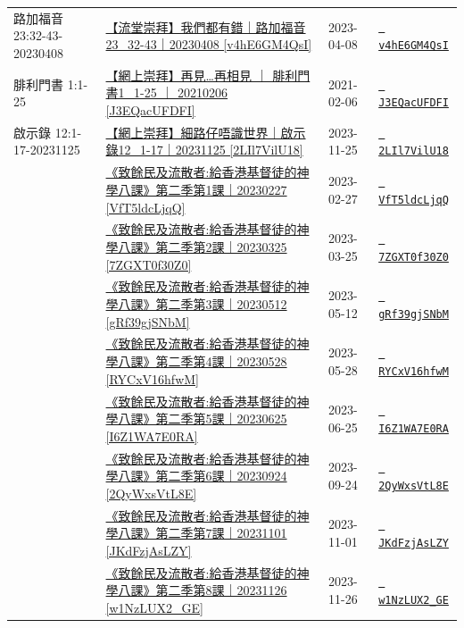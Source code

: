\documentclass{book}
\begin{document}
{\begin{xltabular}{\textwidth}{|p{0.15\textwidth} p{0.6\textwidth}|p{0.07\textwidth} p{0.1\textwidth}|}
路加福音 23:32-43-20230408 & \hyperref[sec:v4hE6GM4QsI]{【流堂崇拜】我們都有錯｜路加福音23\_32-43｜20230408 [v4hE6GM4QsI]} & 2023-04-08 & \href{https://youtube.com/watch?v=v4hE6GM4QsI}{\texttt{ v4hE6GM4QsI}} \\
腓利門書 1:1-25 & \hyperref[sec:J3EQacUFDFI]{【網上崇拜】再見…再相見 ｜ 腓利門書1\_1-25 ｜ 20210206 [J3EQacUFDFI]} & 2021-02-06 & \href{https://youtube.com/watch?v=J3EQacUFDFI}{\texttt{ J3EQacUFDFI}} \\
啟示錄 12:1-17-20231125 & \hyperref[sec:2LIl7VilU18]{【網上崇拜】細路仔唔識世界｜啟示錄12\_1-17｜20231125 [2LIl7VilU18]} & 2023-11-25 & \href{https://youtube.com/watch?v=2LIl7VilU18}{\texttt{ 2LIl7VilU18}} \\
    & \hyperref[sec:VfT5ldcLjqQ]{《致餘民及流散者:給香港基督徒的神學八課》第二季第1課｜20230227 [VfT5ldcLjqQ]} & 2023-02-27 & \href{https://youtube.com/watch?v=VfT5ldcLjqQ}{\texttt{ VfT5ldcLjqQ}} \\
    & \hyperref[sec:7ZGXT0f30Z0]{《致餘民及流散者:給香港基督徒的神學八課》第二季第2課｜20230325 [7ZGXT0f30Z0]} & 2023-03-25 & \href{https://youtube.com/watch?v=7ZGXT0f30Z0}{\texttt{ 7ZGXT0f30Z0}} \\
    & \hyperref[sec:gRf39gjSNbM]{《致餘民及流散者:給香港基督徒的神學八課》第二季第3課｜20230512 [gRf39gjSNbM]} & 2023-05-12 & \href{https://youtube.com/watch?v=gRf39gjSNbM}{\texttt{ gRf39gjSNbM}} \\
    & \hyperref[sec:RYCxV16hfwM]{《致餘民及流散者:給香港基督徒的神學八課》第二季第4課｜20230528 [RYCxV16hfwM]} & 2023-05-28 & \href{https://youtube.com/watch?v=RYCxV16hfwM}{\texttt{ RYCxV16hfwM}} \\
    & \hyperref[sec:I6Z1WA7E0RA]{《致餘民及流散者:給香港基督徒的神學八課》第二季第5課｜20230625 [I6Z1WA7E0RA]} & 2023-06-25 & \href{https://youtube.com/watch?v=I6Z1WA7E0RA}{\texttt{ I6Z1WA7E0RA}} \\
    & \hyperref[sec:2QyWxsVtL8E]{《致餘民及流散者:給香港基督徒的神學八課》第二季第6課｜20230924 [2QyWxsVtL8E]} & 2023-09-24 & \href{https://youtube.com/watch?v=2QyWxsVtL8E}{\texttt{ 2QyWxsVtL8E}} \\
    & \hyperref[sec:JKdFzjAsLZY]{《致餘民及流散者:給香港基督徒的神學八課》第二季第7課｜20231101 [JKdFzjAsLZY]} & 2023-11-01 & \href{https://youtube.com/watch?v=JKdFzjAsLZY}{\texttt{ JKdFzjAsLZY}} \\
    & \hyperref[sec:w1NzLUX2_GE]{《致餘民及流散者:給香港基督徒的神學八課》第二季第8課｜20231126 [w1NzLUX2\_GE]} & 2023-11-26 & \href{https://youtube.com/watch?v=w1NzLUX2_GE}{\texttt{ w1NzLUX2\_GE}} \\

\end{xltabular}}
\end{document}
